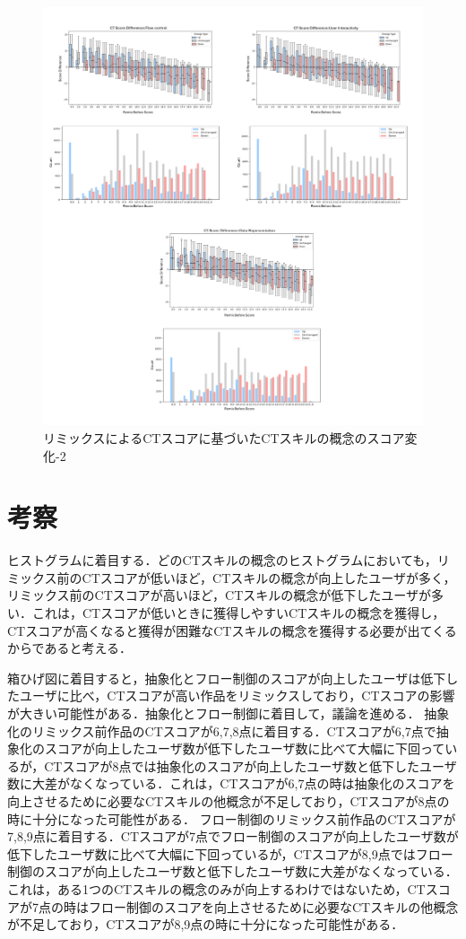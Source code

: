 \documentclass[11pt]{jreport}
\begin{document}
\begin{figure}[h]
\centerline{\includegraphics[width=1.2\linewidth]{@BSthesis2024_Horio/BSthesis2024_Horio_fig/rq3-2.pdf}}
\caption{リミックスによるCTスコアに基づいたCTスキルの概念のスコア変化-2}
\label{fig:rq3-2}
\end{figure}

\section{考察}
ヒストグラムに着目する．どのCTスキルの概念のヒストグラムにおいても，リミックス前のCTスコアが低いほど，CTスキルの概念が向上したユーザが多く，リミックス前のCTスコアが高いほど，CTスキルの概念が低下したユーザが多い．これは，CTスコアが低いときに獲得しやすいCTスキルの概念を獲得し，CTスコアが高くなると獲得が困難なCTスキルの概念を獲得する必要が出てくるからであると考える．

箱ひげ図に着目すると，抽象化とフロー制御のスコアが向上したユーザは低下したユーザに比べ，CTスコアが高い作品をリミックスしており，CTスコアの影響が大きい可能性がある．抽象化とフロー制御に着目して，議論を進める．
抽象化のリミックス前作品のCTスコアが6,7,8点に着目する．CTスコアが6,7点で抽象化のスコアが向上したユーザ数が低下したユーザ数に比べて大幅に下回っているが，CTスコアが8点では抽象化のスコアが向上したユーザ数と低下したユーザ数に大差がなくなっている．これは，CTスコアが6,7点の時は抽象化のスコアを向上させるために必要なCTスキルの他概念が不足しており，CTスコアが8点の時に十分になった可能性がある．
フロー制御のリミックス前作品のCTスコアが7,8,9点に着目する．CTスコアが7点でフロー制御のスコアが向上したユーザ数が低下したユーザ数に比べて大幅に下回っているが，CTスコアが8,9点ではフロー制御のスコアが向上したユーザ数と低下したユーザ数に大差がなくなっている．これは，ある1つのCTスキルの概念のみが向上するわけではないため，CTスコアが7点の時はフロー制御のスコアを向上させるために必要なCTスキルの他概念が不足しており，CTスコアが8,9点の時に十分になった可能性がある．
\end{document}
